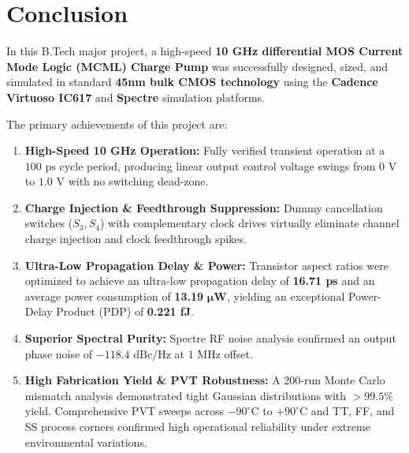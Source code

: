 \documentclass[11pt,a4paper]{report}
\begin{document}
\section{Conclusion}
In this B.Tech major project, a high-speed \textbf{10 GHz differential MOS Current Mode Logic (MCML) Charge Pump} was successfully designed, sized, and simulated in standard \textbf{45nm bulk CMOS technology} using the \textbf{Cadence Virtuoso IC617} and \textbf{Spectre} simulation platforms.

The primary achievements of this project are:
\begin{enumerate}
    \item \textbf{High-Speed 10 GHz Operation:} Fully verified transient operation at a $100\text{ ps}$ cycle period, producing linear output control voltage swings from $0\text{ V}$ to $1.0\text{ V}$ with no switching dead-zone.
    \item \textbf{Charge Injection \& Feedthrough Suppression:} Dummy cancellation switches ($S_3, S_4$) with complementary clock drives virtually eliminate channel charge injection and clock feedthrough spikes.
    \item \textbf{Ultra-Low Propagation Delay \& Power:} Transistor aspect ratios were optimized to achieve an ultra-low propagation delay of \textbf{16.71 ps} and an average power consumption of \textbf{13.19} $\boldsymbol{\mu}$\textbf{W}, yielding an exceptional Power-Delay Product (PDP) of \textbf{0.221 fJ}.
    \item \textbf{Superior Spectral Purity:} Spectre RF noise analysis confirmed an output phase noise of \textbf{$-118.4\text{ dBc/Hz}$} at $1\text{ MHz}$ offset.
    \item \textbf{High Fabrication Yield \& PVT Robustness:} A 200-run Monte Carlo mismatch analysis demonstrated tight Gaussian distributions with $>99.5\%$ yield. Comprehensive PVT sweeps across $-90^\circ\text{C}$ to $+90^\circ\text{C}$ and TT, FF, and SS process corners confirmed high operational reliability under extreme environmental variations.
\end{enumerate}
\end{document}
